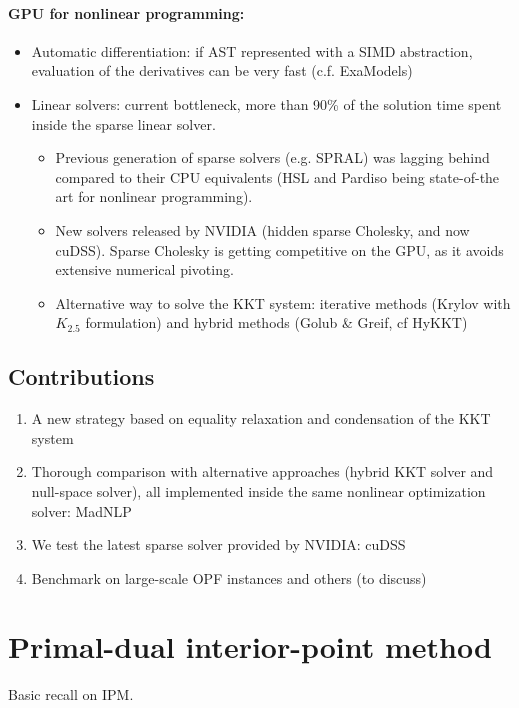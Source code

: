 \documentclass{article}
\theoremstyle{definition}
\theoremstyle{remark}
\begin{document}
\paragraph{GPU for nonlinear programming:}
\begin{itemize}
  \item Automatic differentiation: if AST represented with a SIMD abstraction,
    evaluation of the derivatives can be very fast (c.f. ExaModels)
  \item Linear solvers: current bottleneck, more than 90\% of the solution time spent
    inside the sparse linear solver.
    \begin{itemize}
      \item Previous generation of sparse solvers (e.g. SPRAL)
        was lagging behind compared to their CPU equivalents (HSL and
        Pardiso being state-of-the art for nonlinear programming).
      \item New solvers released by NVIDIA (hidden sparse Cholesky, and now cuDSS).
        Sparse Cholesky is getting competitive on the GPU, as it avoids
        extensive numerical pivoting.
      \item Alternative way to solve the KKT system:
        iterative methods (Krylov with $K_{2.5}$ formulation)
        and hybrid methods (Golub \& Greif, cf HyKKT)
    \end{itemize}
\end{itemize}

\subsection{Contributions}
\begin{enumerate}
  \item A new strategy based on equality relaxation
    and condensation of the KKT system
  \item Thorough comparison with alternative approaches
    (hybrid KKT solver and null-space solver), all implemented
    inside the same nonlinear optimization solver: MadNLP
  \item We test the latest sparse solver provided
    by NVIDIA: cuDSS
  \item Benchmark on large-scale OPF instances
    and others (to discuss)
\end{enumerate}


\section{Primal-dual interior-point method}
Basic recall on IPM.
\end{document}
